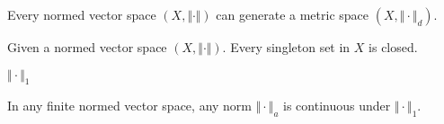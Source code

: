 \begin{definition}[norm]
\end{definition}

\begin{definition}
\end{definition}

\begin{theorem}
Every normed vector space $(X, \Vert\cdot\Vert)$ can generate a metric space $(X, \Vert\cdot\Vert_{d})$. 
\end{theorem} 

\begin{definition}
\end{definition}

\begin{corollary}
Given a normed vector space $(X, \Vert\cdot\Vert)$. Every singleton set in $X$ is closed. 
\end{corollary}

\begin{definition}
\end{definition}

\begin{corollary}
\end{corollary}

\begin{lemma}
\end{lemma}

\begin{notation}[$L_1$ norm]
$\Vert \cdot \Vert_{1}$ 
\end{notation}

\begin{lemma}\label{lemma:Any norm is continuous under L1}
In any finite normed vector space, any norm $\Vert \cdot \Vert_{a}$ is continuous under $\Vert \cdot \Vert_{1}$. 
\end{lemma}

